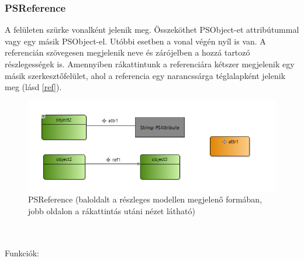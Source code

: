 \subsubsection{PSReference}
A felületen szürke vonalként jelenik meg. Összeköthet PSObject-et attribútummal vagy egy másik PSObject-el. Utóbbi esetben a vonal végén nyíl is van. A referencián szövegesen megjelenik neve és zárójelben a hozzá tartozó részlegességek is. Amennyiben rákattintunk a referenciára kétszer megjelenik egy másik szerkesztőfelület, ahol a referencia egy narancssárga téglalapként jelenik meg (lásd \autoref{ref}).
\begin{figure}[!ht]
	\centering
	\includegraphics{figures/ref.PNG}
	\caption{PSReference (baloldalt a részleges modellen megjelenő formában, jobb oldalon a rákattintás utáni nézet látható)}
	\label{ref} 
\end{figure}
\\\\
Funkciók:
